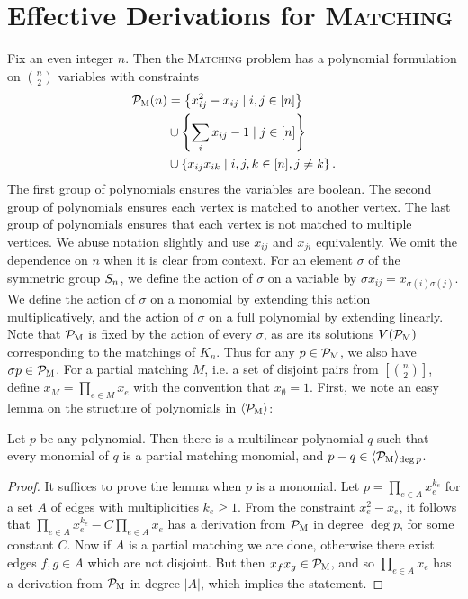 \section{Effective Derivations for \textsc{Matching}}
Fix an even integer $n$. Then the \textsc{Matching} problem has a polynomial formulation on $\binom{n}{2}$ variables with constraints
\begin{align}
\label{eq:matching-formulation}\mathcal P_{\textsc{M}}(n) &= \left\{x_{ij}^2 - x_{ij} \mid i,j \in [n]\right\} \\ &\cup \left\{\sum_i x_{ij} - 1 \mid j \in [n]\right\} \nonumber \\ &\cup \left\{x_{ij}x_{ik} \mid i,j,k \in [n], j\neq k\right\} \nonumber.
\end{align}
The first group of polynomials ensures the variables are boolean. The second group of polynomials ensures each vertex is matched to another vertex. The last group of polynomials ensures that each vertex is not matched to multiple vertices. We abuse notation slightly and use $x_{ij}$ and $x_{ji}$ equivalently. We omit the dependence on $n$ when it is clear from context. For an element $\sigma$ of the symmetric group $S_{n}$, we define the action of $\sigma$ on a variable by $\sigma x_{ij} = x_{\sigma(i)\sigma(j)}$.
We define the action of $\sigma$ on a monomial by extending this action multiplicatively, and the action of $\sigma$ on a full polynomial by extending linearly.
Note that $\mathcal P_{\textsc{M}}$ is fixed by the action of every $\sigma$, as are its solutions $V(\mathcal P_{\textsc{M}})$ corresponding to the matchings of $K_n$. 
Thus for any $p \in \mathcal P_{\textsc{M}}$, we also have $\sigma p \in \mathcal P_{\textsc{M}}$. For a partial matching $M$, i.e. a set of disjoint pairs from $[\binom{n}{2}]$, define $x_M = \prod_{e \in M} x_e$ with the convention that $x_{\emptyset} = 1$.
First, we note an easy lemma on the structure of polynomials in $\langle \mathcal P_{\textsc{M}} \rangle$:
\begin{lemma}\label{lem:monomials}
  Let $p$ be any polynomial. Then there is a multilinear polynomial $q$ such that every monomial of $q$ is a partial matching monomial, and $p-q \in \langle \mathcal P_{\textsc{M}} \rangle_{\deg p}$.
\end{lemma}
\begin{proof}
It suffices to prove the lemma when \(p\) is a monomial. Let
\(p = \prod_{e \in A} x_{e}^{k_{e}}\)
for a set \(A\) of edges with multiplicities \(k_{e} \geq 1\).
From the constraint \(x_{e}^{2} - x_e\), it follows that
$\prod_{e \in A} x_e^{k_e} - C\prod_{e \in A} x_e$ has a derivation from $\mathcal P_{\textsc{M}}$ in degree $\deg p$, for some constant $C$.
Now if $A$ is a partial matching we are done, otherwise there exist edges $f,g \in A$ which are not disjoint.
But then $x_fx_g \in \mathcal P_{\textsc{M}}$, and so $\prod_{e \in A} x_e$ has a derivation from $\mathcal P_{\textsc{M}}$ in degree $|A|$, which implies the statement.
\end{proof}

